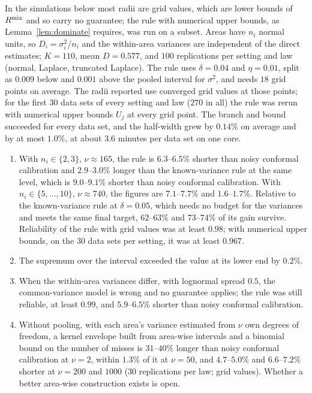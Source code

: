 \documentclass[11pt]{article}
\renewcommand{\_}{\usc\allowbreak}
\begin{document}
In the simulations below most radii are grid values, which are lower bounds of $R^{\rm mix}$ and so carry no guarantee; the rule with numerical upper bounds, as Lemma~\ref{lem:dominate} requires, was run on a subset. Areas have $n_i$ normal units, so $D_i = \sigma_i^2/n_i$ and the within-area variances are independent of the direct estimates; $K = 110$, mean $D = 0.577$, and $100$ replications per setting and law (normal, Laplace, truncated Laplace). The rule uses $\delta = 0.04$ and $\eta = 0.01$, split as $0.009$ below and $0.001$ above the pooled interval for $\sigma^2$, and needs $18$ grid points on average. The radii reported use converged grid values at those points; for the first $30$ data sets of every setting and law ($270$ in all) the rule was rerun with numerical upper bounds $U_j$ at every grid point. The branch and bound succeeded for every data set, and the half-width grew by $0.14\%$ on average and by at most $1.0\%$, at about $3.6$ minutes per data set on one core.
\begin{enumerate}
\item With $n_i \in \{2, 3\}$, $\nu \approx 165$, the rule is $6.3$--$6.5\%$ shorter than noisy conformal calibration and $2.9$--$3.0\%$ longer than the known-variance rule at the same level, which is $9.0$--$9.1\%$ shorter than noisy conformal calibration. With $n_i \in \{5, \ldots, 10\}$, $\nu \approx 740$, the figures are $7.1$--$7.7\%$ and $1.6$--$1.7\%$. Relative to the known-variance rule at $\delta = 0.05$, which needs no budget for the variances and meets the same final target, $62$--$63\%$ and $73$--$74\%$ of its gain survive. Reliability of the rule with grid values was at least $0.98$; with numerical upper bounds, on the $30$ data sets per setting, it was at least $0.967$.
\item The supremum over the interval exceeded the value at its lower end by $0.2\%$.
\item When the within-area variances differ, with lognormal spread $0.5$, the common-variance model is wrong and no guarantee applies; the rule was still reliable, at least $0.99$, and $5.9$--$6.5\%$ shorter than noisy conformal calibration.
\item Without pooling, with each area's variance estimated from $\nu$ own degrees of freedom, a kernel envelope built from area-wise intervals and a binomial bound on the number of misses is $31$--$40\%$ longer than noisy conformal calibration at $\nu = 2$, within $1.3\%$ of it at $\nu = 50$, and $4.7$--$5.0\%$ and $6.6$--$7.2\%$ shorter at $\nu = 200$ and $1000$ ($30$ replications per law; grid values). Whether a better area-wise construction exists is open.
\end{enumerate}
\end{document}
